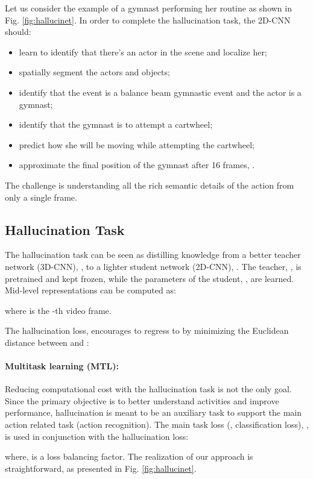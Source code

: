 \documentclass[10pt,twocolumn,letterpaper]{article}
\begin{document}
Let us consider the example of a gymnast performing her routine as shown in Fig. \ref{fig:hallucinet}. In order to complete the hallucination task, the 2D-CNN should:

\begin{itemize}[noitemsep]
\item learn to identify that there's an actor in the scene and localize her;
\item spatially segment the actors and objects;
\item identify that the event is a balance beam gymnastic event and the actor is a gymnast;
\item identify that the gymnast is to attempt a cartwheel;
\item predict how she will be moving while attempting the cartwheel;
\item approximate the final position of the gymnast after 16 frames, \etc.
\end{itemize}

The challenge is understanding all the rich semantic details of the action from only a single frame.

\subsection{Hallucination Task}
The hallucination task can be seen as distilling knowledge from a better teacher network (3D-CNN), , to a lighter student network (2D-CNN), . The teacher, , is pretrained and kept frozen, while the parameters of the student, , are learned. Mid-level representations can be computed as:

where  is the -th video frame.

The hallucination loss,  encourages  to regress  to  by minimizing the Euclidean distance between  and :


\paragraph{Multitask learning (MTL):} Reducing computational cost with the hallucination task is not the only goal. Since the primary objective is to better understand activities and improve performance, hallucination is meant to be an auxiliary task to support the main action related task (\eg action recognition).  The main task loss (\eg, classification loss), , is used in conjunction with the hallucination loss:

where,  is a loss balancing factor. The realization of our approach is straightforward, as presented in Fig. \ref{fig:hallucinet}.
\end{document}
